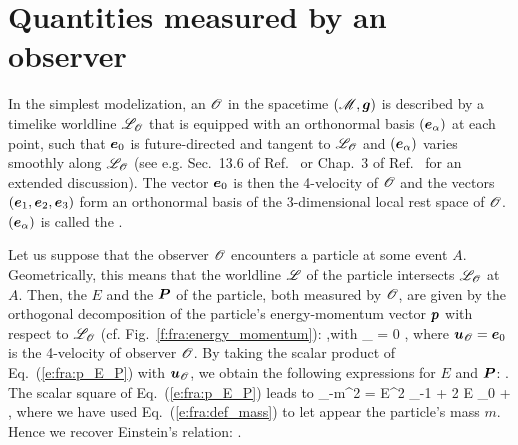 \section{Quantities measured by an observer} \label{s:fra:measure}

In the simplest modelization, an  $\mathscr{O}$
in the spacetime $(\mathscr{M},\bm{g})$ is described by a timelike worldline $\mathscr{L}_{\mathscr{O}}$
that is
equipped with an orthonormal basis $(\bm{e}_\alpha)$ at each point, such
that $\bm{e}_0$ is future-directed and tangent to $\mathscr{L}_{\mathscr{O}}$ and $(\bm{e}_\alpha)$ varies smoothly
along $\mathscr{L}_{\mathscr{O}}$ (see e.g. Sec.~13.6 of Ref.~\cite{MisneTW73} or Chap.~3 of Ref.~\cite{Gourg13} for an extended
discussion).
The vector $\bm{e}_0$ is then the 4-velocity of $\mathscr{O}$
and the vectors $(\bm{e}_1, \bm{e}_2, \bm{e}_3)$ form an orthonormal basis
of the 3-dimensional local rest space of $\mathscr{O}$.
$(\bm{e}_\alpha)$ is called the .

Let us suppose that the observer $\mathscr{O}$ encounters a particle at some event $A$.
Geometrically, this means that the worldline $\mathscr{L}$ of the particle
intersects $\mathscr{L}_{\mathscr{O}}$ at $A$. Then, the 
$E$ and the  $\bm{P}$ of the
particle, both measured by $\mathscr{O}$, are given by the orthogonal decomposition of the
particle's energy-momentum vector $\bm{p}$ with respect to $\mathscr{L}_{\mathscr{O}}$
(cf. Fig.~\ref{f:fra:energy_momentum}):
\be \label{e:fra:p_E_P}
    ,\quad\mbox{with}\quad
        _{\Obs}\cdot{} = 0 ,
\ee
where $\bm{u}_{\mathscr{O}} = \bm{e}_0$ is the 4-velocity of observer $\mathscr{O}$.
By taking the scalar product of Eq.~(\ref{e:fra:p_E_P}) with $\bm{u}_{\mathscr{O}}$,
we obtain the following expressions for $E$ and $\bm{P}$:
\be \label{e:fra:E_obs}
\ee
\be \label{e:fra:P_obs}
     .
\ee
The scalar square of Eq.~(\ref{e:fra:p_E_P}) leads to
\be
    _{-m^2} = E^2
    _{-1} + 2 E _{0}
    + \cdot{} ,
\ee
where we have used Eq.~(\ref{e:fra:def_mass}) to let appear the particle's mass
$m$. Hence we recover Einstein's relation:
\be \label{e:fra:E2_m2_P2}
    .
\ee

